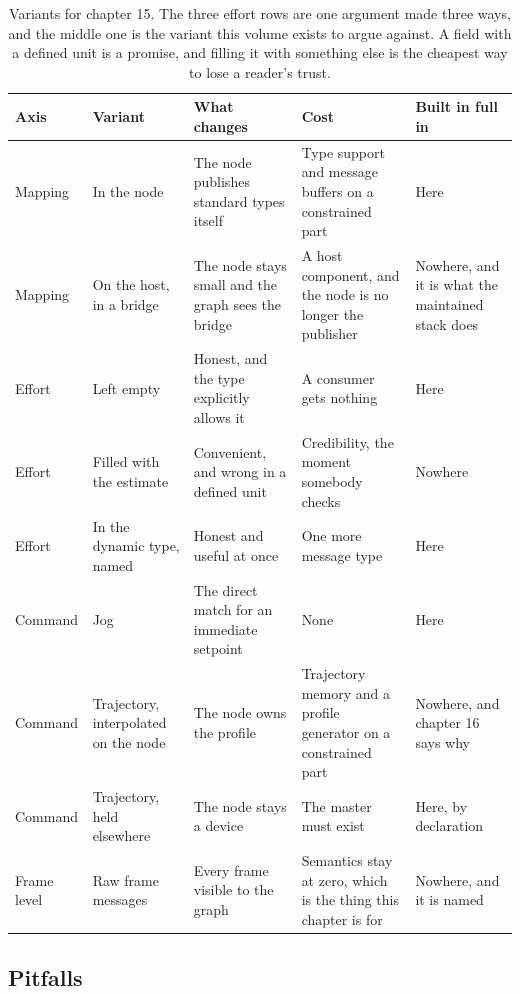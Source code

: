 \begin{table}[H]\centering\small
\begin{tabular}{p{24mm}p{26mm}p{44mm}p{22mm}p{20mm}}
\toprule
Axis & Variant & What changes & Cost & Built in full in \\
\midrule
Mapping & In the node & The node publishes standard types itself & Type support and message buffers on a constrained part & Here \\
Mapping & On the host, in a bridge & The node stays small and the graph sees the bridge & A host component, and the node is no longer the publisher & Nowhere, and it is what the maintained stack does \\
Effort & Left empty & Honest, and the type explicitly allows it & A consumer gets nothing & Here \\
Effort & Filled with the estimate & Convenient, and wrong in a defined unit & Credibility, the moment somebody checks & Nowhere \\
Effort & In the dynamic type, named & Honest and useful at once & One more message type & Here \\
Command & Jog & The direct match for an immediate setpoint & None & Here \\
Command & Trajectory, interpolated on the node & The node owns the profile & Trajectory memory and a profile generator on a constrained part & Nowhere, and chapter 16 says why \\
Command & Trajectory, held elsewhere & The node stays a device & The master must exist & Here, by declaration \\
Frame level & Raw frame messages & Every frame visible to the graph & Semantics stay at zero, which is the thing this chapter is for & Nowhere, and it is named \\
\bottomrule
\end{tabular}
\caption{Variants for chapter 15. The three effort rows are one argument made three ways, and the middle one is the variant this volume exists to argue against. A field with a defined unit is a promise, and filling it with something else is the cheapest way to lose a reader's trust.}
\end{table}

\subsection*{Pitfalls}

